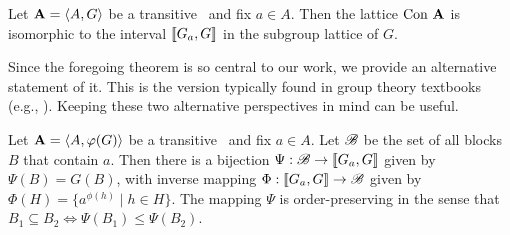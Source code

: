 \begin{theorem}
  \label{thm:g-set-isomorphism2}
  Let $\mathbf{A} = \langle A, G\rangle$ be a transitive \Gset\ and fix $a\in A$.  
  Then the lattice $\operatorname{Con\,} \mathbf{A}$ is isomorphic to the
  interval $\llbracket G_a, G\rrbracket$ in the subgroup lattice of $G$.
\end{theorem}

Since the foregoing theorem is so central to our work, we provide an alternative 
statement of it. This is the version typically found in group theory 
textbooks (e.g., \cite{Dixon:1996}).  Keeping these two alternative perspectives in
mind can be useful.

\begin{theorem}
  Let $\mathbf{A} = \langle A, \varphi(G)\rangle$ be a transitive \Gset\
  and fix $a \in A$. Let $\mathscr{B}$ be the set of all blocks $B$ that contain $a$.
  Then there is a bijection $\Psi :\mathscr{B} \rightarrow \llbracket G_{a},G\rrbracket$ given by $\Psi(B)= G(B)$,
  with inverse mapping $\Phi: \llbracket G_{a},G\rrbracket \rightarrow \mathscr{B} $ 
  given by $\Phi(H) = \{a^{\phi(h)}  \mid  h\in H\}$. 
  The mapping $\Psi$ is order-preserving in the sense
  that
  $B_1\subseteq B_2 \Leftrightarrow \Psi(B_1) \leq \Psi(B_2)$.
\end{theorem}

